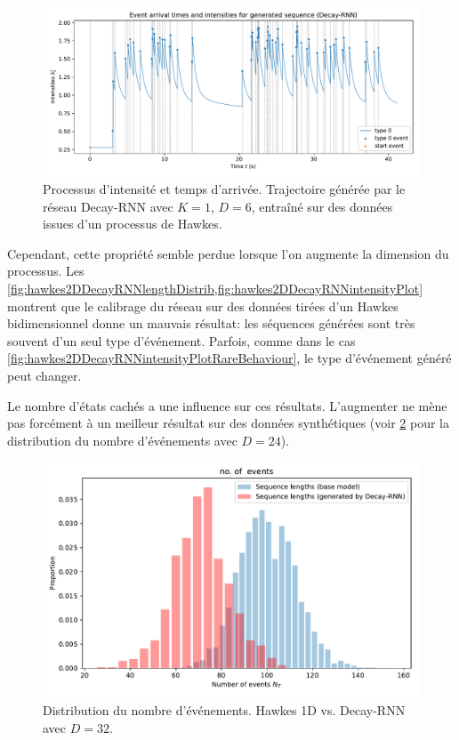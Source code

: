 \documentclass[../main.tex]{subfiles}
\begin{document}
\begin{figure}[htp]
	\includegraphics[width=\linewidth]{../results/intensity_Decay-RNN_1d_hidden8_20181202-140621.pdf}
	\caption{Processus d'intensité et temps d'arrivée. Trajectoire générée par le réseau Decay-RNN avec $K=1$, $D=6$, entraîné sur des données issues d'un processus de Hawkes.}\label{fig:hawkes1DRNNintensityPlot}
\end{figure}

Cependant, cette propriété semble perdue lorsque l'on augmente la dimension du processus. Les \cref{fig:hawkes2DDecayRNNlengthDistrib,fig:hawkes2DDecayRNNintensityPlot} montrent que le calibrage du réseau sur des données tirées d'un Hawkes bidimensionnel donne un mauvais résultat: les séquences générées sont très souvent d'un seul type d'événement. Parfois, comme dans le cas \cref{fig:hawkes2DDecayRNNintensityPlotRareBehaviour}, le type d'événement généré peut changer.

Le nombre d'états cachés a une influence sur ces résultats. L'augmenter ne mène pas forcément à un meilleur résultat sur des données synthétiques (voir \cref{fig:hawkes1DDecayRNNlengthDistribHidden32} pour la distribution du nombre d'événements avec $D=24$).

\begin{figure}[htp]
	\includegraphics[width=\linewidth]{../results/seq_length_distrib_Decay-RNN-1d-hidden_32-20181202-141923.pdf}
	\caption{Distribution du nombre d'événements. Hawkes 1D vs. Decay-RNN avec $D=32$.}\label{fig:hawkes1DDecayRNNlengthDistribHidden32}
\end{figure}
\end{document}
